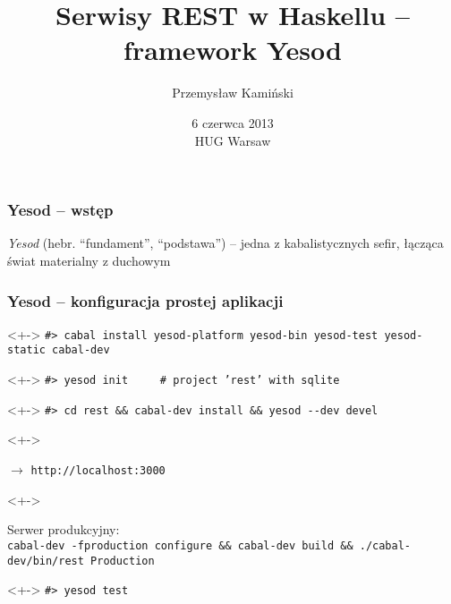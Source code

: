 \documentclass[landscape]{beamer}
\title[Serwisy REST w Haskellu -- framework Yesod]{Serwisy REST w Haskellu -- framework Yesod}
\author{Przemys\l{}aw Kami\'nski}
\date{6 czerwca 2013 \\ HUG Warsaw}
\begin{document}
\begin{frame}
  \titlepage
\end{frame}

\begin{frame}
  \frametitle{Yesod -- wst\k{e}p}
    \emph {Yesod} (hebr. ``fundament'', ``podstawa'') -- jedna z kabalistycznych
    sefir, \l{}\k{a}cz\k{a}ca \'swiat materialny z duchowym
    \uncover<+->{} 
\end{frame}

\begin{frame}
  \frametitle{Yesod -- konfiguracja prostej aplikacji}
  \begin{center}
  \end{center}
  \begin{uncoverenv}<+->
    \texttt{\#> cabal install yesod-platform yesod-bin yesod-test yesod-static
      cabal-dev}
  \end{uncoverenv}

  \begin{uncoverenv}<+->
    \texttt{\#> yesod init \ \ \ \ \# project 'rest' with sqlite}
  \end{uncoverenv}

  \begin{uncoverenv}<+->
    \texttt{\#> cd rest \&\& cabal-dev install \&\& yesod -{}-dev devel}
  \end{uncoverenv}
  
  \begin{uncoverenv}<+->
    \begin{center}
      $\longrightarrow$
      \texttt{http://localhost:3000}
    \end{center}
  \end{uncoverenv}

  \begin{uncoverenv}<+->
    \begin{center}
      Serwer produkcyjny: \\
      \texttt{cabal-dev -fproduction configure \&\& cabal-dev build \&\&
        ./cabal-dev/bin/rest Production}
    \end{center}
  \end{uncoverenv}

  \begin{uncoverenv}<+->
     \texttt{\#> yesod test}
  \end{uncoverenv}
\end{frame}
\end{document}
